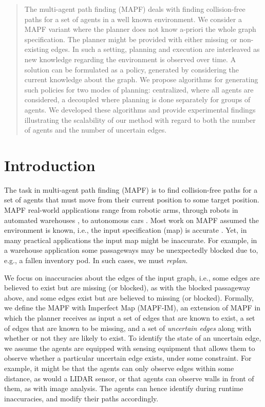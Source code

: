 \documentclass[letterpaper]{article} %
\def\
UrlFont{\rm}  %
\theoremstyle{definition}
\begin{document}
\begin{abstract}
{The multi-agent path finding (MAPF) deals with finding collision-free paths for a set of agents in a well known environment. We consider a MAPF variant where the planner does not know a-priori the whole graph specification. The planner might be provided with either missing or non-existing edges. In such a setting, planning and execution are interleaved as new knowledge regarding the environment is observed over time. A solution can be formulated as a policy, generated by considering the current knowledge about the graph. We propose algorithms for generating such policies for two modes of planning: centralized, where all agents are considered, a decoupled where planning is done separately for groups of agents. We developed these algorithms and provide experimental findings illustrating the scalability of our method with regard to both the number of agents and the number of uncertain edges.
}

\end{abstract}

\section{Introduction}

The task in multi-agent path finding (MAPF) is to find collision-free paths for a set of agents that must move from their current position to some target position. MAPF real-world applications range from robotic arms, through robots in automated warehouses \cite{wurman2008coordinating}, to autonomous cars \cite{veloso2015cobots}. 
Most work on MAPF assumed the environment is known, i.e., the input specification (map) is accurate \cite{stern2019multi}. 
Yet, in many practical applications the input map might be inaccurate. For example, in a warehouse application some passageways may be unexpectedly blocked due to, e.g., a fallen inventory pod. 
In such cases, we must {\em replan}. %


We focus on inaccuracies about the edges of the input graph, i.e., some edges are believed to exist but are missing (or blocked), as with the blocked passageway above, and some edges exist but are believed to missing (or blocked). %
Formally, we define the MAPF with Imperfect Map (MAPF-IM), an extension of MAPF in which the planner receives as input a set of edges that are known to exist, a set of edges that are known to be missing, and a set of \emph{uncertain edges} along with whether or not they are likely to exist. To identify the state of an uncertain edge, we assume the agents are equipped with sensing equipment that allows them to observe whether a particular uncertain edge exists, under some constraint. For example, it might be that the agents can only observe edges within some distance, as would a LIDAR sensor, or that agents can observe walls in front of them, as with image analysis. The agents can hence identify during runtime inaccuracies, and modify their paths accordingly.
\end{document}
